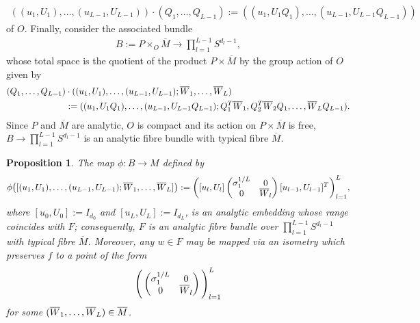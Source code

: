 \documentclass{article}
\newcommand{\bW}{\smash{\overline{W}}\vphantom{W}}
\newcommand{\bM}{\overline{M}}
\theoremstyle{plain}
\newtheorem{proposition}[theorem]{Proposition}
\theoremstyle{definition}
\theoremstyle{remark}
\begin{document}
\begin{align}
((u_1,U_1),\dots,(u_{L-1},U_{L-1}))\cdot(Q_1,\dots,Q_{L-1}):=((u_1,U_1Q_1),\dots,(u_{L-1},U_{L-1}Q_{L-1}))
\end{align}
of $O$. Finally, consider the associated bundle
\begin{align}
B:=P\times_{O}\bM\rightarrow \prod_{l=1}^{L-1}S^{d_l-1},
\end{align}
whose total space is the quotient of the product $P\times\bM$ by the group action of $O$ given by
\begin{align}
(Q_1,\dots,Q_{L-1})&\cdot ((u_1,U_1),\dots,(u_{L-1},U_{L-1});\bW_1,\dots,\bW_L)\\&:=((u_1,U_1Q_1),\dots,(u_{L-1},U_{L-1}Q_{L-1});Q_1^T\bW_1,Q_2^T\bW_2Q_1,\dots,\bW_LQ_{L-1}).
\end{align}
Since $P$ and $\bM$ are analytic, $O$ is compact and its action on $P\times\bM$ is free, $B\rightarrow\prod_{l=1}^{L-1}S^{d_l-1}$ is an analytic fibre bundle with typical fibre $\bM$.

\begin{proposition}\label{prop:fibrebundle}
    The map $\phi:B\rightarrow M$ defined by
    \begin{align}
    \phi\big([(u_1,U_1),\dots,(u_{L-1},U_{L-1});\bW_1,\dots,\bW_L]\big):=\bigg([u_l,U_l]\begin{pmatrix} \sigma_1^{1/L} & 0 \\ 0 & \bW_l\end{pmatrix}[u_{l-1},U_{l-1}]^T\bigg)_{l=1}^L,
    \end{align}
    where $[u_0,U_0] := I_{d_0}$ and $[u_L,U_L]:=I_{d_L}$, is an analytic embedding whose range coincides with $F$; consequently, $F$ is an analytic fibre bundle over $\prod_{l=1}^{L-1}S^{d_l-1}$ with typical fibre $\bM$. Moreover, any $w\in F$ may be mapped via an isometry which preserves $f$ to a point of the form
    \begin{align}\label{eq:wnormalform}
    \Bigg(\begin{pmatrix} \sigma_1^{1/L} & 0 \\ 0 & \bW_l\end{pmatrix}\Bigg)_{l=1}^L
    \end{align}
    for some $(\bW_1,\dots,\bW_L)\in \bM$.
\end{proposition}
\end{document}
